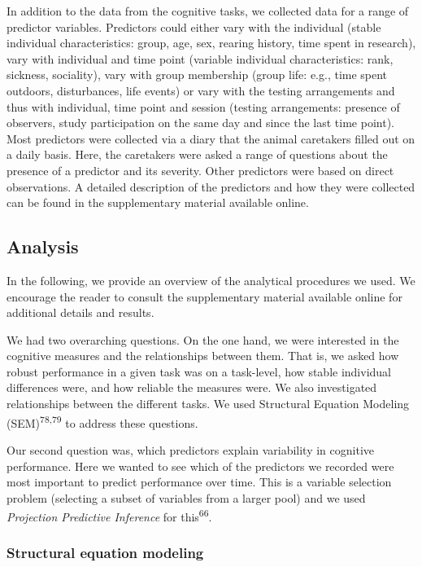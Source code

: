 \documentclass[
  man,floatsintext]{apa6}
\begin{document}
In addition to the data from the cognitive tasks, we collected data for a range of predictor variables. Predictors could either vary with the individual (stable individual characteristics: group, age, sex, rearing history, time spent in research), vary with individual and time point (variable individual characteristics: rank, sickness, sociality), vary with group membership (group life: e.g., time spent outdoors, disturbances, life events) or vary with the testing arrangements and thus with individual, time point and session (testing arrangements: presence of observers, study participation on the same day and since the last time point). Most predictors were collected via a diary that the animal caretakers filled out on a daily basis. Here, the caretakers were asked a range of questions about the presence of a predictor and its severity. Other predictors were based on direct observations. A detailed description of the predictors and how they were collected can be found in the supplementary material available online.

\hypertarget{analysis}{%
\subsection{Analysis}\label{analysis}}

In the following, we provide an overview of the analytical procedures we used. We encourage the reader to consult the supplementary material available online for additional details and results.

We had two overarching questions. On the one hand, we were interested in the cognitive measures and the relationships between them. That is, we asked how robust performance in a given task was on a task-level, how stable individual differences were, and how reliable the measures were. We also investigated relationships between the different tasks. We used Structural Equation Modeling (SEM)\textsuperscript{78,79} to address these questions.

Our second question was, which predictors explain variability in cognitive performance. Here we wanted to see which of the predictors we recorded were most important to predict performance over time. This is a variable selection problem (selecting a subset of variables from a larger pool) and we used \emph{Projection Predictive Inference} for this\textsuperscript{66}.

\hypertarget{structural-equation-modeling}{%
\subsubsection{Structural equation modeling}\label{structural-equation-modeling}}
\end{document}
